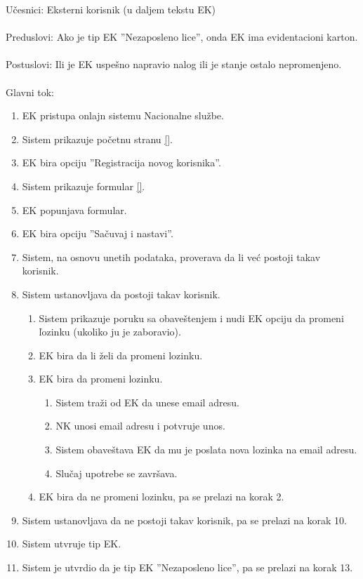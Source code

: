 \noindent U\v cesnici: Eksterni korisnik (u daljem tekstu EK)
\\
\\ Preduslovi: Ako je tip EK ''Nezaposleno lice'', onda EK ima evidentacioni karton.
\\
\\ Postuslovi: Ili je EK uspe\v sno napravio nalog ili je stanje ostalo nepromenjeno.
\\ 
\\ Glavni tok:
\begin{enumerate}
	\item EK pristupa onlajn sistemu Nacionalne slu\v zbe.
	\item Sistem prikazuje po\v cetnu stranu \ref{}.
	\item EK bira opciju ''Registracija novog korisnika''.
	\item Sistem prikazuje formular \ref{}.
	\item EK popunjava formular.
	\item EK bira opciju ''Sa\v cuvaj i nastavi''.
	\item Sistem, na osnovu unetih podataka, proverava da li ve\'c postoji takav korisnik.
	\item Sistem ustanovljava da postoji takav korisnik.
	\begin{enumerate}
		\item Sistem prikazuje poruku sa obave\v stenjem i nudi EK opciju da promeni \v lozinku (ukoliko ju je zaboravio).
		\item EK bira da li \v zeli da promeni lozinku.
		\item EK bira da promeni lozinku.
		\begin{enumerate}
			\item Sistem tra\v zi od EK da unese email adresu.
			\item NK unosi email adresu i potvr\dj uje unos.
			\item Sistem obave\v stava EK da mu je poslata nova lozinka na email adresu.
			\item Slu\v caj upotrebe se zavr\v sava.
		\end{enumerate}
		\item EK bira da ne promeni lozinku, pa se prelazi na korak 2.
	\end{enumerate}
	\item Sistem ustanovljava da ne postoji takav korisnik, pa se prelazi na korak 10.
	\item Sistem utvr\dj uje tip EK.
	\item Sistem je utvrdio da je tip EK ''Nezaposleno lice'', pa se prelazi na korak 13.

\end{enumerate}
